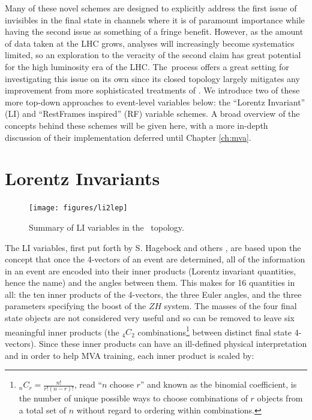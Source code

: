 Many of these novel schemes are designed to explicitly address the first issue of invisibles in the final state in channels where it is of paramount importance while having the second issue as something of a fringe benefit.  However, as the amount of data taken at the LHC grows, analyses will increasingly become systematics limited, so an exploration to the veracity of the second claim has great potential for the high luminosity era of the LHC.  The \ZH\,process offers a great setting for investigating this issue on its own since its closed topology largely mitigates any improvement from more sophisticated treatments of \met.  We introduce two of these more top-down approaches to event-level variables below: the ``Lorentz Invariant'' (LI) \cite{litalk} and ``RestFrames inspired'' (RF) \cite{rjr} variable schemes.  A broad overview of the concepts behind these schemes will be given here, with a more in-depth discussion of their implementation deferred until Chapter \ref{ch:mva}.


\section{Lorentz Invariants}
\label{sec:li}
\begin{figure}[!htbp]\captionsetup{justification=centering}
  \centering
  \texttt{[image: figures/li2lep]}
  \caption{Summary of LI variables in the \ZH\, topology.}
  \label{fig:li}
\end{figure}
  The LI variables, first put forth by S. Hagebock and others \cite{litalk}, are based upon the concept that once the 4-vectors of an event are determined, all of the information in an event are encoded into their inner products (Lorentz invariant quantities, hence the name) and the angles between them.  This makes for 16 quantities in all: the ten inner products of the 4-vectors, the three Euler angles, and the three parameters specifying the boost of the $ZH$ system.  The masses of the four final state objects are not considered very useful and so can be removed to leave six meaningful inner products (the $_4C_2$ combinations\footnote{$_nC_r=\frac{n!}{r!\left(n-r\right)!}$, read ``$n$ choose $r$'' and known as the binomial coefficient, is the number of unique possible ways to choose combinations of $r$ objects from a total set of $n$ without regard to ordering within combinations.} between distinct final state 4-vectors).  Since these inner products can have an ill-defined physical interpretation and in order to help MVA training, each inner product is scaled by:

